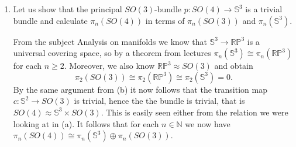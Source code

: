 \documentclass[a4paper, 12pt]{article}
\renewcommand{\S}{\mathbb{S}}
\newcommand{\N}{\mathbb{N}}
\newcommand{\R}{\mathbb{R}}
\renewcommand{\P}{\mathbb{P}}
\newcommand{\iso}{\cong}
\newcommand{\homeo}{\approx}
\begin{document}
\begin{enumerate}[label=(\alph*)]
	\item Let us show that the principal $SO(3)$-bundle $p \colon SO(4) \to \S^3$ is a trivial bundle and calculate $\pi_n(SO(4))$ in terms of $\pi_n(SO(3))$ and $\pi_n(\S^3)$.
	
	From the subject Analysis on manifolds we know that $\S^3 \to \R\P^3$ is a universal covering space, so by a theorem from lectures $\pi_n(\S^3) \iso \pi_n(\R\P^3)$ for each $n \geq 2$. Moreover, we also know $\R\P^3 \homeo SO(3)$ and obtain
	\[
	\pi_2(SO(3)) \iso \pi_2(\R\P^3) \iso \pi_2(\S^3) = 0.
	\]
	By the same argument from (b) it now follows that the transition map $c \colon  \S^2 \to SO(3)$ is trivial, hence the the bundle is trivial, that is $SO(4) \homeo \S^3 \times SO(3)$. This is easily seen either from the relation we were looking at in (a).
	It follows that for each $n \in \N$ we now have $\pi_n(SO(4)) \iso \pi_n(\S^3) \oplus \pi_n(SO(3))$.
\end{enumerate}
\end{document}
